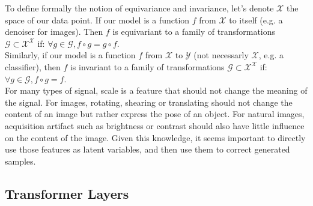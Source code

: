 \documentclass[letterpaper, twoside]{article}
\begin{document}
        To define formally the notion of equivariance and invariance, let's denote $\mathcal{X}$ the space of our data point. If our model is a function $f$ from $\mathcal{X}$ to itself (e.g. a denoiser for images). Then $f$ is equivariant to a family of transformations $\mathcal{G} \subset \mathcal{X}^\mathcal{X}$ if: 
        $\forall g \in \mathcal{G}, f \circ g = g \circ f$.\\
        Similarly, if our model is a function $f$ from $\mathcal{X}$ to $\mathcal{Y}$ (not necessarly $\mathcal{X}$, e.g. a classifier), then $f$ is invariant to a family of transformations $\mathcal{G} \subset \mathcal{X}^\mathcal{X}$ if: 
        $\forall g \in \mathcal{G}, f \circ g = f$.\\
        For many types of signal, scale is a feature that should not change the meaning of the signal. For images, rotating, shearing or translating should not change the content of an image but rather express the pose of an object. For natural images, acquisition artifact such as brightness or contrast should also have little influence on the content of the image. Given this knowledge, it seems important to directly use those features as latent variables, and then use them to correct generated samples.\\

  \subsection{Transformer Layers}
\end{document}
